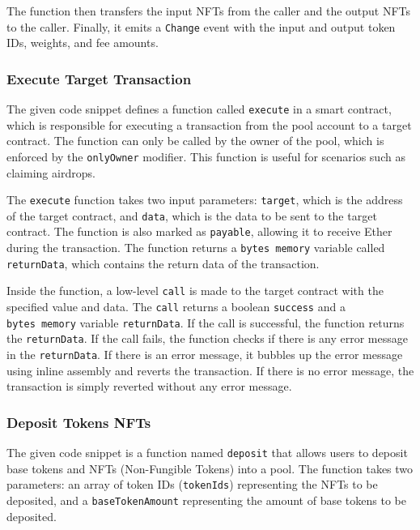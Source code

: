 The function then transfers the input NFTs from the caller and the
output NFTs to the caller. Finally, it emits a \texttt{Change} event
with the input and output token IDs, weights, and fee amounts.

\hypertarget{execute-target-transaction}{%
\subsubsection{Execute Target
Transaction}\label{execute-target-transaction}}

The given code snippet defines a function called \texttt{execute} in a
smart contract, which is responsible for executing a transaction from
the pool account to a target contract. The function can only be called
by the owner of the pool, which is enforced by the \texttt{onlyOwner}
modifier. This function is useful for scenarios such as claiming
airdrops.

The \texttt{execute} function takes two input parameters:
\texttt{target}, which is the address of the target contract, and
\texttt{data}, which is the data to be sent to the target contract. The
function is also marked as \texttt{payable}, allowing it to receive
Ether during the transaction. The function returns a
\texttt{bytes\ memory} variable called \texttt{returnData}, which
contains the return data of the transaction.

Inside the function, a low-level \texttt{call} is made to the target
contract with the specified value and data. The \texttt{call} returns a
boolean \texttt{success} and a \texttt{bytes\ memory} variable
\texttt{returnData}. If the call is successful, the function returns the
\texttt{returnData}. If the call fails, the function checks if there is
any error message in the \texttt{returnData}. If there is an error
message, it bubbles up the error message using inline assembly and
reverts the transaction. If there is no error message, the transaction
is simply reverted without any error message.

\hypertarget{deposit-tokens-nfts}{%
\subsubsection{Deposit Tokens NFTs}\label{deposit-tokens-nfts}}

The given code snippet is a function named \texttt{deposit} that allows
users to deposit base tokens and NFTs (Non-Fungible Tokens) into a pool.
The function takes two parameters: an array of token IDs
(\texttt{tokenIds}) representing the NFTs to be deposited, and a
\texttt{baseTokenAmount} representing the amount of base tokens to be
deposited.

